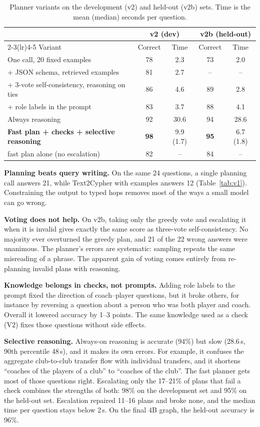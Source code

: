 \documentclass[11pt]{article}
\begin{document}
\begin{table}[t]\centering\small
\caption{Planner variants on the development (v2) and held-out (v2b) sets. Time is the mean (median) seconds per question.}
\label{tab:ablation}
\begin{tabular}{@{}lcccc@{}}\toprule
& \multicolumn{2}{c}{v2 (dev)} & \multicolumn{2}{c}{v2b (held-out)}\\\cmidrule(lr){2-3}\cmidrule(lr){4-5}
Variant & Correct & Time & Correct & Time\\\midrule
One call, 20 fixed examples & 78 & 2.3 & 73 & 2.0\\
+ JSON schema, retrieved examples & 81 & 2.7 & -- & --\\
+ 3-vote self-consistency, reasoning on ties & 86 & 4.6 & 89 & 2.8\\
\quad + role labels in the prompt & 83 & 3.7 & 88 & 4.1\\
Always reasoning & 92 & 30.6 & 94 & 28.6\\
\textbf{Fast plan + checks + selective reasoning} & \textbf{98} & 9.9 (1.7) & \textbf{95} & 6.7 (1.8)\\
\quad fast plan alone (no escalation) & 82 & -- & 84 & --\\\bottomrule
\end{tabular}
\end{table}

\textbf{Planning beats query writing.} On the same 24 questions, a single planning call answers 21, while Text2Cypher with examples answers 12 (Table~\ref{tab:v1}). Constraining the output to typed hops removes most of the ways a small model can go wrong.

\textbf{Voting does not help.} On v2b, taking only the greedy vote and escalating it when it is invalid gives exactly the same score as three-vote self-consistency. No majority ever overturned the greedy plan, and 21 of the 22 wrong answers were unanimous. The planner's errors are systematic: sampling repeats the same misreading of a phrase. The apparent gain of voting comes entirely from re-planning invalid plans with reasoning.

\textbf{Knowledge belongs in checks, not prompts.} Adding role labels to the prompt fixed the direction of coach--player questions, but it broke others, for instance by reversing a question about a person who was both player and coach. Overall it lowered accuracy by 1--3 points. The same knowledge used as a check (V2) fixes those questions without side effects.

\textbf{Selective reasoning.} Always-on reasoning is accurate (94\%) but slow (28.6\,s, 90th percentile 48\,s), and it makes its own errors. For example, it confuses the aggregate club-to-club transfer flow with individual transfers, and it shortens ``coaches of the players of a club'' to ``coaches of the club''. The fast planner gets most of those questions right. Escalating only the 17--21\% of plans that fail a check combines the strengths of both: 98\% on the development set and 95\% on the held-out set. Escalation repaired 11--16 plans and broke none, and the median time per question stays below 2\,s. On the final 4B graph, the held-out accuracy is 96\%.
\end{document}
